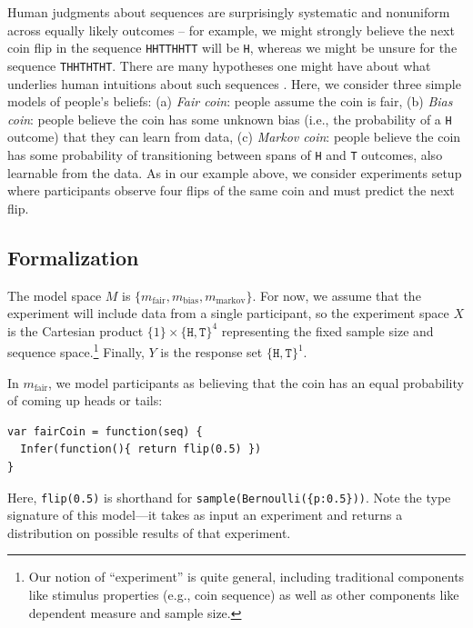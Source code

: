 \documentclass{article}
\begin{document}
Human judgments about sequences are surprisingly systematic and nonuniform across equally likely outcomes -- for example, we might strongly believe the next coin flip in the sequence \lstinline{HHTTHHTT} will be \lstinline{H}, whereas we might be unsure for the sequence \lstinline{THHTHTHT}.
There are many hypotheses one might have about what underlies human intuitions about such sequences \cite{goodfellow38:jep, falk81:pme, Griffiths2004_nips}.
Here, we consider three simple models of people's beliefs: (a) \emph{Fair coin}: people assume the coin is fair, (b) \emph{Bias coin}: people believe the coin has some unknown bias (i.e., the probability of a \lstinline{H} outcome) that they can learn from data, (c) \emph{Markov coin}: people believe the coin has some probability of transitioning between spans of \lstinline{H} and \lstinline{T} outcomes, also learnable from the data.
As in our example above, we consider experiments setup where participants observe four flips of the same coin and must predict the next flip.


\subsection{Formalization}

The model space $M$ is $\{m_{\text{fair}}, m_{\text{bias}}, m_{\text{markov}}\}$.
For now, we assume that the experiment will include data from a single participant, so the experiment space $X$ is the Cartesian product $\{1\} \times \{\texttt{H}, \texttt{T}\}^4$ representing the fixed sample size and sequence space.\footnote{Our notion of ``experiment'' is quite general, including traditional components like stimulus properties (e.g., coin sequence) as well as other components like dependent measure and sample size.}
Finally, $Y$ is the response set $\{\texttt{H}, \texttt{T}\}^1$.

In $m_{\text{fair}}$, we model participants as believing that the coin has an equal probability of coming up heads or tails:
\begin{lstlisting}[upquote=true]
var fairCoin = function(seq) {
  Infer(function(){ return flip(0.5) })
}
\end{lstlisting}
Here, \lstinline{flip(0.5)} is shorthand for \lstinline|sample(Bernoulli({p:0.5}))|.
Note the type signature of this model---it takes as input an experiment and returns a distribution on possible results of that experiment.
\end{document}
